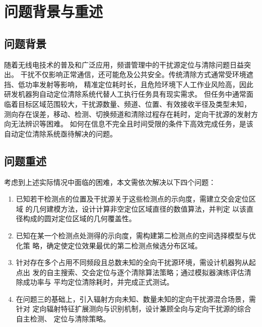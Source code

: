 \section{问题背景与重述}

\subsection{问题背景}
随着无线电技术的普及和广泛应用，频谱管理中的干扰源定位与清除问题日益突出。
干扰不仅影响正常通信，还可能危及公共安全。传统清除方式通常受环境遮挡、低功率发射等影响，
精准定位耗时长，且危险环境下人工作业风险高，因此研发机器狗自动定位清除系统代替人工执行任务具有现实需求。
但任务中通常面临着目标区域范围较大，干扰源数量、频道、位置、有效接收半径及类型未知，
测向存在误差，移动、检测、切换频道和清除过程存在耗时，定向干扰源的发射方向无法辨识等困难。
如何在信息不完全且时间受限的条件下高效完成任务，是该自动定位清除系统亟待解决的问题。

\subsection{问题重述}
考虑到上述实际情况中面临的困难，本文需依次解决以下四个问题：

\begin{enumerate}
    \item 已知若干检测点的位置及干扰源关于这些检测点的示向度，需建立交会定位区域
          的几何建模方法，设计计算非空定位区域直径的数值算法，并判定
          以该直径构成的圆对定位区域的几何覆盖性。
    \item 已知在某一个检测点处测得的示向度，需构建第二检测点的空间选择模型与优化策
          略，确定使定位效果最优的第二检测点候选分布区域。
    \item 针对存在多个占用不同频段且总数未知的全向干扰源环境，需设计机器狗从起点出
          发的自主搜索、交会定位与逐个清除算法策略；通过模拟器演练评估清除成功率与
          平均定位清除耗时，并完成正式测试。
    \item 在问题三的基础上，引入辐射方向未知、数量未知的定向干扰源混合场景，需针对
          定向辐射特征扩展测向与识别机制，设计兼顾全向与定向干扰源的综合自主检测、
          定位与清除策略。
\end{enumerate}
